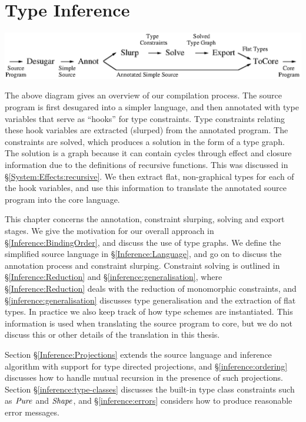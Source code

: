 
\chapter{Type Inference}
\vspace{-1em}
\begin{center}
\includegraphics{3-Inference/fig/intro/overview}
\end{center}

The above diagram gives an overview of our compilation process. The source program is first desugared into a simpler language, and then annotated with type variables that serve as ``hooks'' for type constraints. Type constraints relating these hook variables are extracted (slurped) from the annotated program. The constraints are solved, which produces a solution in the form of a type graph. The solution is a graph because it can contain cycles through effect and closure information due to the definitions of recursive functions. This was discussed in \S\ref{System:Effects:recursive}. We then extract flat, non-graphical types for each of the hook variables, and use this information to translate the annotated source program into the core language.

This chapter concerns the annotation, constraint slurping, solving and export stages. We give the motivation for our overall approach in \S\ref{Inference:BindingOrder}, and discuss the use of type graphs. We define the simplified source language in \S\ref{Inference:Language}, and go on to discuss the annotation process and constraint slurping. Constraint solving is outlined in \S\ref{Inference:Reduction} and \S\ref{inference:generalisation}, where \S\ref{Inference:Reduction} deals with the reduction of monomorphic constraints, and \S\ref{inference:generalisation} discusses type generalisation and the extraction of flat types. In practice we also keep track of how type schemes are instantiated. This information is used when translating the source program to core, but we do not discuss this or other details of the translation in this thesis.

Section \S\ref{Inference:Projections} extends the source language and inference algorithm with support for type directed projections, and \S\ref{inference:ordering} discusses how to handle mutual recursion in the presence of such projections. Section \S\ref{inference:type-classes} discusses the built-in type class constraints such as $\operatorname{\mathit{Pure}}$ and $\operatorname{\mathit{Shape}}$, and \S\ref{inference:errors} considers how to produce reasonable error messages.





\clearpage{}









